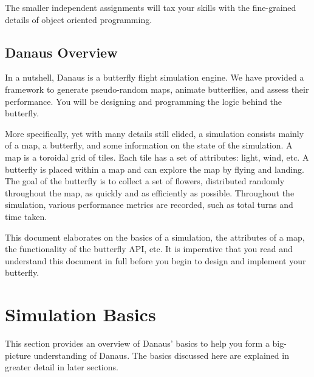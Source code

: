 \documentclass{pset}
\begin{document}
The smaller independent assignments will tax your skills with the fine-grained
details of object oriented programming.
\fi

\ifx \DANAUSOVERVIEW \undefined \else
\subsection{Danaus Overview}
In a nutshell, Danaus is a butterfly flight simulation engine. We have provided
a framework to generate pseudo-random maps, animate butterflies, and assess
their performance. You will be designing and programming the logic behind the
butterfly.

More specifically, yet with many details still elided, a simulation consists
mainly of a map, a butterfly, and some information on the state of the
simulation. A map is a toroidal grid of tiles. Each tile has a set of
attributes: light, wind, etc. A butterfly is placed within a map and can
explore the map by flying and landing. The goal of the butterfly is to collect
a set of flowers, distributed randomly throughout the map, as quickly and as
efficiently as possible. Throughout the simulation, various performance metrics
are recorded, such as total turns and time taken.

This document elaborates on the basics of a simulation, the attributes of a
map, the functionality of the butterfly API, etc. It is imperative that you
read and understand this document in full before you begin to design and
implement your butterfly.
\fi
\fi

\ifx \SIMULATIONBASICS \undefined \else
\section{Simulation Basics}
This section provides an overview of Danaus' basics to help you form a
big-picture understanding of Danaus. The basics discussed here are explained in
greater detail in later sections. 
\ifx \PARKSMAPSTILES \undefined \else
\end{document}
